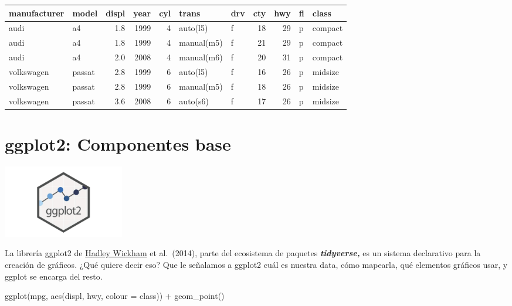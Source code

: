 \documentclass[
]{book}
\newenvironment{Shaded}{\begin{snugshade}}{\end{snugshade}}
\newcommand{\AttributeTok}[1]{\textcolor[rgb]{0.77,0.63,0.00}{#1}}
\newcommand{\FunctionTok}[1]{\textcolor[rgb]{0.00,0.00,0.00}{#1}}
\newcommand{\NormalTok}[1]{#1}
\newcommand{\SpecialCharTok}[1]{\textcolor[rgb]{0.00,0.00,0.00}{#1}}
\begin{document}
\begin{tabular}{l|l|r|r|r|l|l|r|r|l|l}
\hline
manufacturer & model & displ & year & cyl & trans & drv & cty & hwy & fl & class\\
\hline
audi & a4 & 1.8 & 1999 & 4 & auto(l5) & f & 18 & 29 & p & compact\\
\hline
audi & a4 & 1.8 & 1999 & 4 & manual(m5) & f & 21 & 29 & p & compact\\
\hline
audi & a4 & 2.0 & 2008 & 4 & manual(m6) & f & 20 & 31 & p & compact\\
\hline
volkswagen & passat & 2.8 & 1999 & 6 & auto(l5) & f & 16 & 26 & p & midsize\\
\hline
volkswagen & passat & 2.8 & 1999 & 6 & manual(m5) & f & 18 & 26 & p & midsize\\
\hline
volkswagen & passat & 3.6 & 2008 & 6 & auto(s6) & f & 17 & 26 & p & midsize\\
\hline
\end{tabular}

\hypertarget{ggplot2-componentes-base}{%
\chapter{ggplot2: Componentes base}\label{ggplot2-componentes-base}}

\includegraphics[width=2.08333in,height=\textheight]{Data/ggplot2_logo.png}

La librería ggplot2 de \href{http://hadley.nz/}{Hadley Wickham} et al.~(2014), parte del ecosistema de paquetes \textbf{\emph{tidyverse,}} es un sistema declarativo para la creación de gráficos. ¿Qué quiere decir eso? Que le señalamos a ggplot2 cuál es nuestra data, cómo mapearla, qué elementos gráficos usar, y ggplot se encarga del resto.

\begin{Shaded}
\begin{Highlighting}[]
\FunctionTok{ggplot}\NormalTok{(mpg, }\FunctionTok{aes}\NormalTok{(displ, hwy, }\AttributeTok{colour =}\NormalTok{ class)) }\SpecialCharTok{+} 
  \FunctionTok{geom\_point}\NormalTok{()}
\end{Highlighting}
\end{Shaded}
\end{document}
